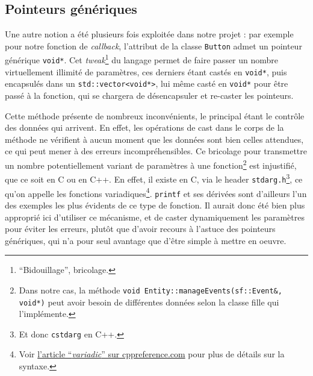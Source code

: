 \documentclass[a4paper,10pt]{report}
\begin{document}
\subsection{Pointeurs génériques}
Une autre notion a été plusieurs fois exploitée dans notre projet : par exemple pour notre fonction de \textit{callback}, l'attribut de la classe \texttt{Button} admet un pointeur générique \texttt{void*}. Cet \textit{tweak}\footnote{``Bidouillage'', bricolage.} du langage permet de faire passer un nombre virtuellement illimité de paramètres, ces derniers étant castés en \texttt{void*}, puis encapsulés dans un \texttt{std::vector<void*>}, lui même casté en \texttt{void*} pour être passé à la fonction, qui se chargera de désencapsuler et re-caster les pointeurs.

Cette méthode présente de nombreux inconvénients, le principal étant le contrôle des données qui arrivent. En effet, les opérations de cast dans le corps de la méthode ne vérifient à aucun moment que les données sont bien celles attendues, ce qui peut mener à des erreurs incompréhensibles. Ce bricolage pour transmettre un nombre potentiellement variant de paramètres à une fonction\footnote{Dans notre cas, la méthode \texttt{void Entity::manageEvents(sf::Event\&, void*)} peut avoir besoin de différentes données selon la classe fille qui l'implémente.} est injustifié, que ce soit en C ou en C++. En effet, il existe en C, via le header \texttt{stdarg.h}\footnote{Et donc \texttt{cstdarg} en C++.}, ce qu'on appelle les fonctions variadiques\footnote{Voir \href{http://en.cppreference.com/w/cpp/utility/variadic}{l'article ``\textit{variadic}'' sur cppreference.com} pour plus de détails sur la syntaxe.}. \texttt{printf} et ses dérivées sont d'ailleurs l'un des exemples les plus évidents de ce type de fonction. Il aurait donc été bien plus approprié ici d'utiliser ce mécanisme, et de caster dynamiquement les paramètres pour éviter les erreurs, plutôt que d'avoir recours à l'astuce des pointeurs génériques, qui n'a pour seul avantage que d'être simple à mettre en oeuvre.
\end{document}
